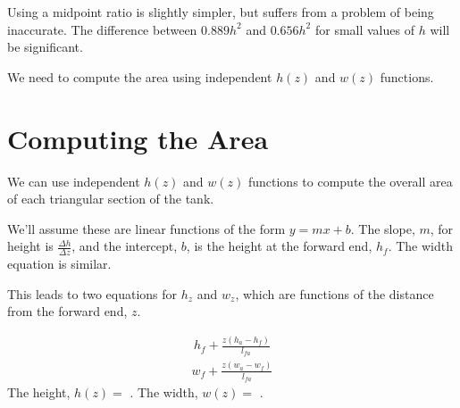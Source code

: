 \documentclass[letterpaper,10pt,english]{sphinxmanual}
\begin{document}
\sphinxAtStartPar
Using a midpoint ratio is slightly simpler, but suffers from a problem of being inaccurate. The difference between \(0.889h^2\) and \(0.656h^2\) for small values of \(h\) will be significant.

\sphinxAtStartPar
We need to compute the area using independent \(h(z)\) and \(w(z)\) functions.


\section{Computing the Area}
\label{\detokenize{prism-irregular:computing-the-area}}
\sphinxAtStartPar
We can use independent \(h(z)\) and \(w(z)\) functions to compute the overall area of each triangular section of the tank.

\sphinxAtStartPar
We’ll assume these are linear functions of the form \(y = mx + b\). The slope, \(m\), for height is \(\frac{\Delta h}{\Delta z}\), and the intercept, \(b\), is the height at the forward end, \(h_f\). The width equation is similar.

\sphinxAtStartPar
This leads to two equations for \(h_z\) and \(w_z\), which are functions of the distance from the forward end, \(z\).

\begin{sphinxVerbatim}[commandchars=\\\{\}]
          
 
          
 
\end{sphinxVerbatim}
\begin{equation*}
\begin{split}\displaystyle h_{f} + \frac{z \left(h_{a} - h_{f}\right)}{l_{fa}}\end{split}
\end{equation*}\begin{equation*}
\begin{split}\displaystyle w_{f} + \frac{z \left(w_{a} - w_{f}\right)}{l_{fa}}\end{split}
\end{equation*}
\sphinxAtStartPar
The height, \(h(z) =\) . The width, \(w(z) =\) .
\end{document}
